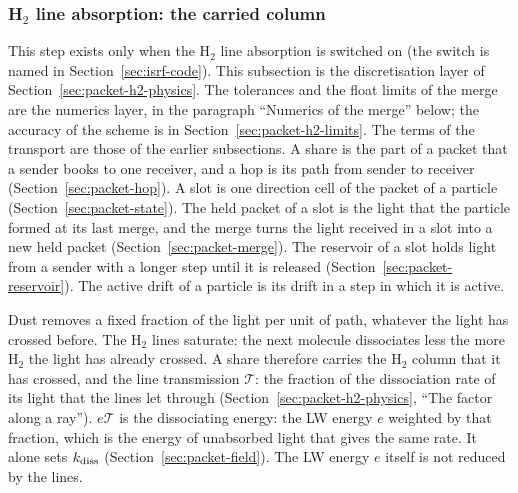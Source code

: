 \subsubsection{\texorpdfstring{H$_2$}{H2} line absorption: the carried column}
\label{sec:packet-h2}

This step exists only when the H$_2$ line absorption is switched on (the
switch is named in Section~\ref{sec:isrf-code}). This subsection is the
discretisation layer of Section~\ref{sec:packet-h2-physics}. The tolerances and
the float limits of the merge are the numerics layer, in the paragraph
``Numerics of the merge'' below; the accuracy of the scheme is in
Section~\ref{sec:packet-h2-limits}. The terms of the transport are those of
the earlier subsections. A share is the part of a packet that a sender books
to one receiver, and a hop is its path from sender to receiver
(Section~\ref{sec:packet-hop}). A slot is one direction cell of the packet of a
particle (Section~\ref{sec:packet-state}). The held packet of a slot is the
light that the particle formed at its last merge, and the merge turns the
light received in a slot into a new held packet
(Section~\ref{sec:packet-merge}). The reservoir of a slot holds light from a
sender with a longer step until it is released
(Section~\ref{sec:packet-reservoir}). The active drift of a particle is its
drift in a step in which it is active.

Dust removes a fixed fraction of the light per unit of path, whatever the
light has crossed before. The H$_2$ lines saturate: the next molecule
dissociates less the more H$_2$ the light has already crossed. A share
therefore carries the H$_2$ column that it has crossed, and the line
transmission $\mathcal T$: the fraction of the dissociation rate of its light
that the lines let through (Section~\ref{sec:packet-h2-physics}, ``The factor
along a ray''). $e\mathcal T$ is the dissociating energy: the LW energy $e$
weighted by that fraction, which is the energy of unabsorbed light that gives
the same rate. It alone sets $k_{\rm diss}$ (Section~\ref{sec:packet-field}).
The LW energy $e$ itself is not reduced by the lines.

